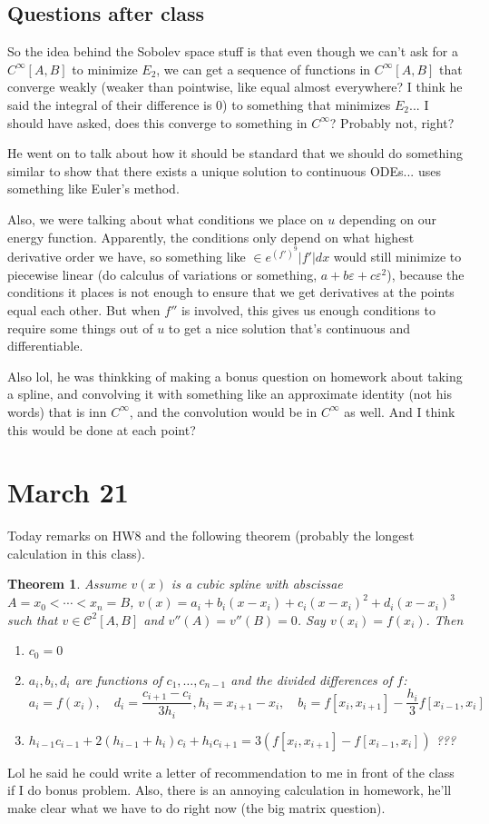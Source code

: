 \documentclass{article}
\theoremstyle{plain}
\newtheorem{theorem}{Theorem}
\theoremstyle{remark}
\newcommand{\ep}{{\varepsilon}}
\begin{document}
\subsection{Questions after class}
So the idea behind the Sobolev space stuff is that
even though we can't ask for a $C^\infty[A,B]$ to minimize $E_2$,
we can get a sequence of functions in $C^\infty[A,B]$ that converge
weakly (weaker than pointwise, like equal almost everywhere?
I think he said the integral of their difference is $0$)
to something that minimizes $E_2$...
I should have asked, does this converge to something in $C^\infty$?
Probably not, right?

He went on to talk about how it should be standard that we should
do something similar to show that there exists a unique solution
to continuous ODEs... uses something like Euler's method.

Also, we were talking about what conditions we place on $u$ depending on our energy function.
Apparently, the conditions only depend on what highest derivative order we have,
so something like $\in e^{(f')^9}|f'|dx$ would still minimize to piecewise linear
(do calculus of variations or something, $a + b \ep + c \ep^2$),
because the conditions it places is not enough to ensure
that we get derivatives at the points equal each other.
But when $f''$ is involved, this gives us enough conditions
to require some things out of $u$ to get a nice solution that's continuous and differentiable.

Also lol, he was thinkking of making a bonus question on homework
about taking a spline, and convolving it with something like
an approximate identity (not his words) that is inn $C^ \infty$,
and the convolution would be in $C^\infty$ as well.
And I think this would be done at each point?


\section{March 21}
Today remarks on HW8 and the following theorem (probably the longest calculation
in this class).
\begin{theorem}
	Assume $v(x)$ is a cubic spline with abscissae
	$A = x_0 < \cdots < x_n = B$,
	$v(x) = a_i + b_i(x-x_i) + c_i(x-x_i)^2 + d_i(x-x_i)^3$
	such that $v \in \mathcal{C}^2[A,B]$ and
	$v''(A) = v''(B) = 0$.
	Say $v(x_i) = f(x_i)$. Then
	\begin{enumerate}
		\item $c_0 = 0$
		\item $a_i,b_i,d_i$ are functions of $c_1,\dots,c_{n-1}$ and
			the divided differences of $f$:
			\[
				a_i = f(x_i), \quad
				d_i = \frac{c_{i+1} - c_i}{3h_i}, h_i = x_{i+1} - x_i,\quad
				b_i = f[x_i,x_{i+1}] - \frac{h_i}{3}f[x_{i-1},x_i]
			\]
		\item $h_{i-1}c_{i-1} + 2(h_{i-1} + h_i)c_i + h_ic_{i+1}
			= 3(f[x_i,x_{i+1}] - f[x_{i-1},x_i])$ ???
	\end{enumerate}
\end{theorem}
Lol he said he could write a letter of recommendation to me in front of the class
if I do bonus problem.
Also, there is an annoying calculation in homework,
he'll make clear what we have to do right now (the big matrix question).
\end{document}
